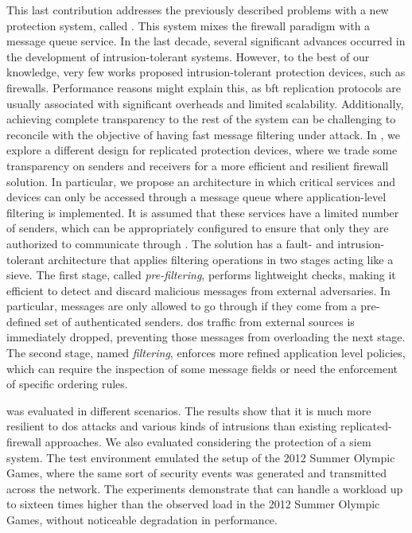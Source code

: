 This last contribution addresses the previously described problems with a new protection system, called \sieveq.
This system mixes the firewall paradigm with a message queue service.
In the last decade, several significant advances occurred in the development of intrusion-tolerant systems.
However, to the best of our knowledge, very few works proposed intrusion-tolerant protection devices, such as firewalls.
Performance reasons might explain this, as \gls{bft} replication protocols are usually associated with significant overheads and limited scalability.
Additionally, achieving complete transparency to the rest of the system can be challenging to reconcile with the objective of having fast message filtering under attack.
In \sieveq, we explore a different design for replicated protection devices, where we trade some transparency on senders and receivers for a more efficient and resilient firewall solution.
In particular, we propose an architecture in which critical services and devices can only be accessed through a message queue where application-level filtering is implemented.
It is assumed that these services have a limited number of senders, which can be appropriately configured to ensure that only they are authorized to communicate through \sieveq.
The solution has a fault- and intrusion-tolerant architecture that applies filtering operations in two stages acting like a sieve.
The first stage, called \emph{pre-filtering}, performs lightweight checks, making it efficient to detect and discard malicious messages from external adversaries.
In particular, messages are only allowed to go through if they come from a pre-defined set of authenticated senders.
\gls{dos} traffic from external sources is immediately dropped, preventing those messages from overloading the next stage.
The second stage, named \emph{filtering}, enforces more refined application level policies, which can require the inspection of some message fields or need the enforcement of specific ordering rules.


\sieveq was evaluated in different scenarios.
The results show that it is much more resilient to \gls{dos} attacks and various kinds of intrusions than existing replicated-firewall approaches.
We also evaluated \sieveq considering the protection of a \gls{siem} system.
The test environment emulated the setup of the 2012 Summer Olympic Games, where the same sort of security events was generated and transmitted across the network. 
The experiments demonstrate that \sieveq can handle a workload up to sixteen times higher than the observed load in the 2012 Summer Olympic Games, without noticeable degradation in performance.


